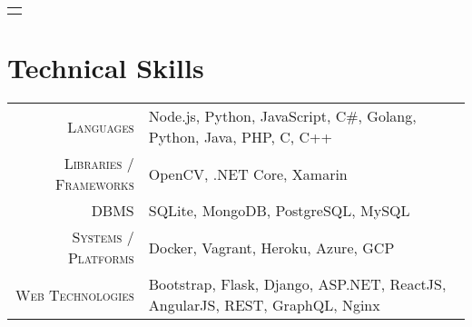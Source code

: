 \documentclass[a4paper,10pt]{extarticle} %
\begin{document}
\begin{tabular}{p{19.7cm}}
\begin{description}[style=nextline, font=$\bullet$\hspace{2mm}\normalsize]


\end{description}
\end{tabular}

\vspace{-0.6cm}
\section{\textcolor{primary}{Technical Skills}}

\begin{tabular}{r|p{15cm}}
\textsc{Languages} & Node.js, Python, JavaScript, C#, Golang, Python, Java, PHP, C, C++ \\
\textsc{Libraries / Frameworks} & OpenCV, .NET Core, Xamarin \\
\textsc{DBMS} & SQLite, MongoDB, PostgreSQL, MySQL \\
\textsc{Systems / Platforms} & Docker, Vagrant, Heroku, Azure, GCP \\
\textsc{Web Technologies} & Bootstrap, Flask, Django, ASP.NET, ReactJS, AngularJS, REST, GraphQL, Nginx \\
\end{tabular}


\vspace{-0.2cm}
\end{document}
